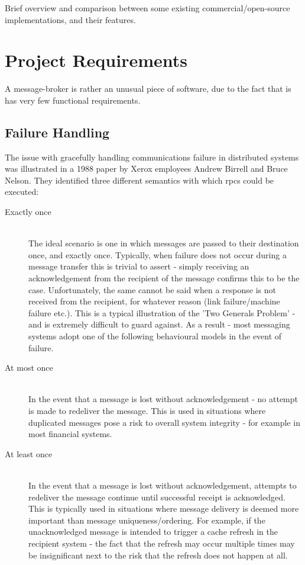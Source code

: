 Brief overview and comparison between some existing commercial/open-source
implementations, and their features.


\section{Project Requirements}
\label{sec:SLA/QoS Specification}

A message-broker is rather an unusual piece of software, due to the fact that is has very few functional requirements.

\subsection{Failure Handling}
\label{sub:Failure Handling}

The issue with gracefully handling communications failure in distributed systems
was illustrated in a 1988 paper by Xerox employees
Andrew Birrell and Bruce Nelson\cite{Birrell:1988:IRP:59309.59336}. They identified
three different semantics with which \glspl{rpc} could be executed:

\begin{description}
  \item[Exactly once] \hfill \\
    The ideal scenario is one in which messages are passed to their destination
    once, and exactly once. Typically, when failure does not occur during a
    message transfer this is trivial to assert - simply receiving an acknowledgement
    from the recipient of the message confirms this to be the case.
    Unfortunately, the same cannot be said when a response is not received from
    the recipient, for whatever reason (link failure/machine failure etc.).
    This is a typical illustration of the
    'Two Generals Problem'\cite{Gray:1978:NDB:647433.723863} - and is extremely
    difficult to guard against. As a result - most messaging systems adopt one
    of the following behavioural models in the event of failure.
  \item[At most once] \hfill \\
    In the event that a message is lost without acknowledgement - no attempt is made
    to redeliver the message. This is used in situations where duplicated messages
    pose a risk to overall system integrity - for example in most financial systems.
  \item[At least once] \hfill \\
    In the event that a message is lost without acknowledgement, attempts to
    redeliver the message continue until successful receipt is acknowledged.
    This is typically used in situations where message delivery is deemed more
    important than message uniqueness/ordering. For example, if the unacknowledged
    message is intended to trigger a cache refresh in the recipient system - the
    fact that the refresh may occur multiple times may be insignificant next to
    the risk that the refresh does not happen at all.
\end{description}

